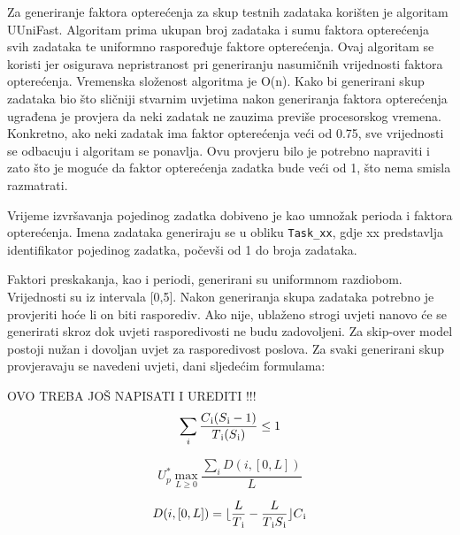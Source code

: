 \documentclass[../zavrsni.tex]{subfiles}
\begin{document}
Za generiranje faktora opterećenja za skup testnih zadataka korišten je algoritam UUniFast. Algoritam prima ukupan broj zadataka 
i sumu faktora opterećenja svih zadataka te uniformno raspoređuje faktore opterećenja. 
Ovaj algoritam se koristi jer osigurava nepristranost pri generiranju nasumičnih vrijednosti faktora opterećenja.
Vremenska složenost algoritma je O(n). Kako bi generirani skup zadataka bio što sličniji stvarnim uvjetima
nakon generiranja faktora opterećenja ugrađena je provjera da neki zadatak ne zauzima previše procesorskog vremena. Konkretno, ako neki zadatak ima faktor
opterećenja veći od 0.75, sve vrijednosti se odbacuju i algoritam se ponavlja. Ovu provjeru bilo je potrebno napraviti i zato što je moguće da faktor
opterećenja zadatka bude veći od 1, što nema smisla razmatrati.

Vrijeme izvršavanja pojedinog zadatka dobiveno je kao umnožak perioda i faktora opterećenja.
Imena zadataka generiraju se u obliku \texttt{Task\_xx}, gdje xx predstavlja identifikator pojedinog zadatka, počevši od 1 do broja zadataka.

Faktori preskakanja, kao i periodi, generirani su uniformnom razdiobom. Vrijednosti su iz intervala [0,5].
Nakon generiranja skupa zadataka potrebno je provjeriti hoće li on biti rasporediv. Ako nije, ublaženo strogi uvjeti nanovo 
će se generirati skroz dok uvjeti rasporedivosti ne budu zadovoljeni. Za skip-over model postoji nužan i dovoljan uvjet za rasporedivost 
poslova. Za svaki generirani skup provjeravaju se navedeni uvjeti, dani sljedećim formulama: 

OVO TREBA JOŠ NAPISATI I UREDITI !!!
\begin{equation*}
    \sum_{i}\frac{C\textsubscript{i}(S\textsubscript{i}-1)}{T\textsubscript{i}(S\textsubscript{i})} \le 1
\end{equation*}

\begin{equation*}
    U_{p}^{*} \max_{L\geq0}\frac{\sum_{i}D(i,[0,L])}{L}
\end{equation*}


\begin{equation*}
    D(i,[0,L])=\lfloor \frac{L}{T\textsubscript{i}}-\frac{L}{T\textsubscript{i}S\textsubscript{i}} \rfloor C\textsubscript{i}
\end{equation*}
\end{document}
